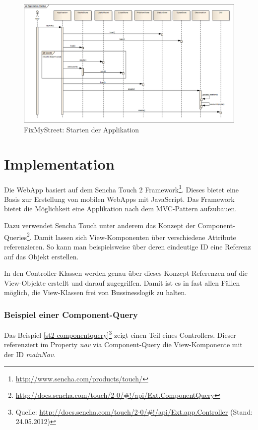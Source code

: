 \begin{figure}[H]
	\centering
	\includegraphics[width=\textwidth]{images/usecase2-fixmystreet/uml/fixmystreet-sequencediagram-applicationstartup}
	\caption{FixMyStreet: Starten der Applikation}
	\label{fixmystreet-sequencediagram-applicationstartup}
\end{figure}

\section{Implementation}
Die \gls{WebApp} basiert auf dem Sencha Touch 2 Framework\footnote{\url{http://www.sencha.com/products/touch/}}. Dieses bietet eine Basis zur Erstellung von mobilen \gls{WebApp}s mit JavaScript. Das Framework bietet die Möglichkeit eine Applikation nach dem MVC-Pattern aufzubauen.

Dazu verwendet Sencha Touch unter anderem das Konzept der Component-Queries\footnote{\url{http://docs.sencha.com/touch/2-0/\#!/api/Ext.ComponentQuery}}. Damit lassen sich View-Komponenten über verschiedene Attribute referenzieren. So kann man beispielsweise über deren eindeutige ID eine Referenz auf das Objekt erstellen.

In den Controller-Klassen werden genau über dieses Konzept Referenzen auf die View-Objekte erstellt und darauf zugegriffen. Damit ist es in fast allen Fällen möglich, die View-Klassen frei von Bussinesslogik zu halten.

\subsubsection{Beispiel einer Component-Query}
Das Beispiel \ref{st2-componentquery}\footnote{Quelle: \url{http://docs.sencha.com/touch/2-0/\#!/api/Ext.app.Controller} (Stand: 24.05.2012)} zeigt einen Teil eines Controllers. Dieser referenziert im Property \emph{nav} via Component-Query die View-Komponente mit der ID \emph{mainNav}.

